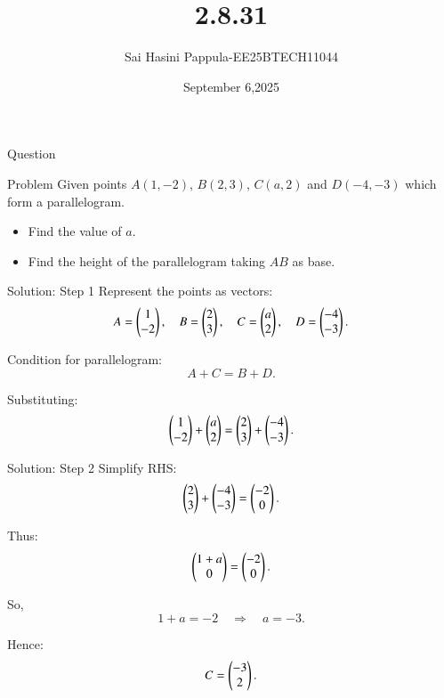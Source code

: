 \documentclass{beamer}
\title %
{2.8.31}
\date{September 6,2025}
\author %
{Sai Hasini Pappula-EE25BTECH11044}
\begin{document}
\begin{frame}{Question}
\begin{block}{Problem}
Given points $A(1,-2)$, $B(2,3)$, $C(a,2)$ and $D(-4,-3)$ which form a parallelogram. 

\begin{itemize}
    \item Find the value of $a$.
    \item Find the height of the parallelogram taking $AB$ as base.
\end{itemize}
\end{block}
\end{frame}

\begin{frame}{Solution: Step 1}
Represent the points as vectors:
\begin{equation}
A=\begin{pmatrix}1\\-2\end{pmatrix},\quad B=\begin{pmatrix}2\\3\end{pmatrix},\quad C=\begin{pmatrix}a\\2\end{pmatrix},\quad D=\begin{pmatrix}-4\\-3\end{pmatrix}.
\end{equation}

Condition for parallelogram:
\begin{equation}
A+C=B+D.
\end{equation}

Substituting:
\begin{equation}
\begin{pmatrix}1\\-2\end{pmatrix}+\begin{pmatrix}a\\2\end{pmatrix}=\begin{pmatrix}2\\3\end{pmatrix}+\begin{pmatrix}-4\\-3\end{pmatrix}.
\end{equation}
\end{frame}

\begin{frame}{Solution: Step 2}
Simplify RHS:
\begin{equation}
\begin{pmatrix}2\\3\end{pmatrix}+\begin{pmatrix}-4\\-3\end{pmatrix}=\begin{pmatrix}-2\\0\end{pmatrix}.
\end{equation}

Thus:
\begin{equation}
\begin{pmatrix}1+a\\0\end{pmatrix}=\begin{pmatrix}-2\\0\end{pmatrix}.
\end{equation}

So,
\begin{equation}
1+a=-2 \quad \Longrightarrow \quad a=-3.
\end{equation}

Hence:
\begin{equation}
C=\begin{pmatrix}-3\\2\end{pmatrix}.
\end{equation}
\end{frame}
\end{document}
